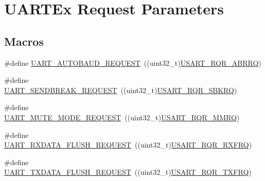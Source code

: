 \hypertarget{group___u_a_r_t___request___parameters}{}\section{U\+A\+R\+T\+Ex Request Parameters}
\label{group___u_a_r_t___request___parameters}
\subsection*{Macros}
\begin{DoxyCompactItemize}
\item 
\#define \hyperlink{group___u_a_r_t___request___parameters_ga8cdce81a934ab7d0c2eecb4d85300d4e}{U\+A\+R\+T\+\_\+\+A\+U\+T\+O\+B\+A\+U\+D\+\_\+\+R\+E\+Q\+U\+E\+ST}~((uint32\+\_\+t)\hyperlink{group___peripheral___registers___bits___definition_gad261e1474dfb5329b5520e22790b026b}{U\+S\+A\+R\+T\+\_\+\+R\+Q\+R\+\_\+\+A\+B\+R\+RQ})
\item 
\#define \hyperlink{group___u_a_r_t___request___parameters_ga52ced88a9f4ce90f3725901cf91f38b3}{U\+A\+R\+T\+\_\+\+S\+E\+N\+D\+B\+R\+E\+A\+K\+\_\+\+R\+E\+Q\+U\+E\+ST}~((uint32\+\_\+t)\hyperlink{group___peripheral___registers___bits___definition_ga2d1a36c6b492c425b4e5cc94d983ecf1}{U\+S\+A\+R\+T\+\_\+\+R\+Q\+R\+\_\+\+S\+B\+K\+RQ})
\item 
\#define \hyperlink{group___u_a_r_t___request___parameters_gadd5f511803928fd042f7fc6ef99f9cfb}{U\+A\+R\+T\+\_\+\+M\+U\+T\+E\+\_\+\+M\+O\+D\+E\+\_\+\+R\+E\+Q\+U\+E\+ST}~((uint32\+\_\+t)\hyperlink{group___peripheral___registers___bits___definition_ga2aae0f4fb0a74822ce212ea7d9b8463a}{U\+S\+A\+R\+T\+\_\+\+R\+Q\+R\+\_\+\+M\+M\+RQ})
\item 
\#define \hyperlink{group___u_a_r_t___request___parameters_gaf2ee2d4b1bdcbc7772ddc0da89566936}{U\+A\+R\+T\+\_\+\+R\+X\+D\+A\+T\+A\+\_\+\+F\+L\+U\+S\+H\+\_\+\+R\+E\+Q\+U\+E\+ST}~((uint32\+\_\+t)\hyperlink{group___peripheral___registers___bits___definition_ga7b148ee7c697bbcf836648063613612a}{U\+S\+A\+R\+T\+\_\+\+R\+Q\+R\+\_\+\+R\+X\+F\+RQ})
\item 
\#define \hyperlink{group___u_a_r_t___request___parameters_gafecbd800f456ed666a42ac0842cd2c4b}{U\+A\+R\+T\+\_\+\+T\+X\+D\+A\+T\+A\+\_\+\+F\+L\+U\+S\+H\+\_\+\+R\+E\+Q\+U\+E\+ST}~((uint32\+\_\+t)\hyperlink{group___peripheral___registers___bits___definition_gaa40d2e52b5955b30c9399eb3dec769e8}{U\+S\+A\+R\+T\+\_\+\+R\+Q\+R\+\_\+\+T\+X\+F\+RQ})
\end{DoxyCompactItemize}



